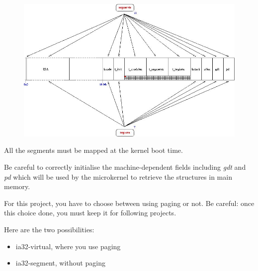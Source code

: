 \begin{figure}[h]
\centerline{\includegraphics[scale=0.5]{figures/k1-memory-layout.jpg}}
\end{figure}

All the segments must be mapped at the kernel boot time.

Be careful to correctly initialise the machine-dependent fields
including \textit{gdt} and \textit{pd} which will be used by the microkernel
to retrieve the structures in main memory.

For this project,  you have to choose between using  paging or not. Be
careful:  once  this choice  done,  you  must  keep it  for  following
projects.

Here are the two possibilities:

\begin{itemize}
\item ia32-virtual, where you use paging
\item ia32-segment, without paging
\end{itemize}

